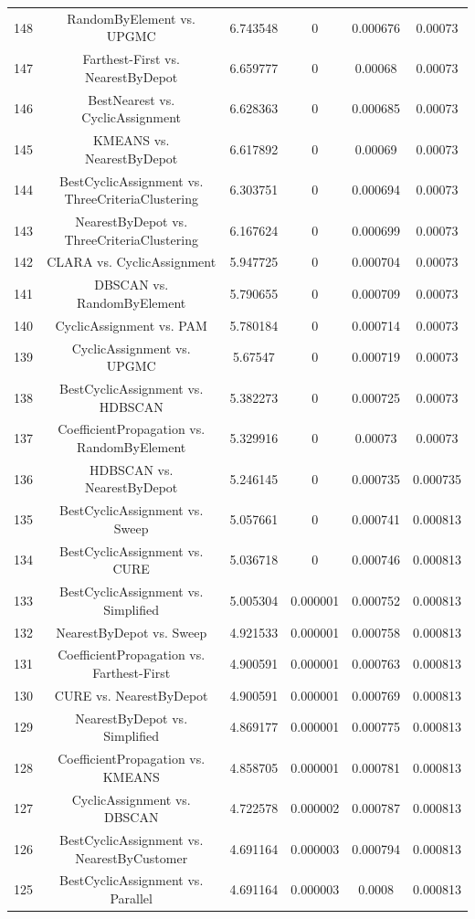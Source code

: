 \documentclass[a4paper,10pt]{article}
\begin{document}
\begin{landscape}
\begin{table}[!htp]
\begin{tabular}{cccccc}
148&RandomByElement vs. UPGMC&6.743548&0&0.000676&0.00073\\
147&Farthest-First vs. NearestByDepot&6.659777&0&0.00068&0.00073\\
146&BestNearest vs. CyclicAssignment&6.628363&0&0.000685&0.00073\\
145&KMEANS vs. NearestByDepot&6.617892&0&0.00069&0.00073\\
144&BestCyclicAssignment vs. ThreeCriteriaClustering&6.303751&0&0.000694&0.00073\\
143&NearestByDepot vs. ThreeCriteriaClustering&6.167624&0&0.000699&0.00073\\
142&CLARA vs. CyclicAssignment&5.947725&0&0.000704&0.00073\\
141&DBSCAN vs. RandomByElement&5.790655&0&0.000709&0.00073\\
140&CyclicAssignment vs. PAM&5.780184&0&0.000714&0.00073\\
139&CyclicAssignment vs. UPGMC&5.67547&0&0.000719&0.00073\\
138&BestCyclicAssignment vs. HDBSCAN&5.382273&0&0.000725&0.00073\\
137&CoefficientPropagation vs. RandomByElement&5.329916&0&0.00073&0.00073\\
136&HDBSCAN vs. NearestByDepot&5.246145&0&0.000735&0.000735\\
135&BestCyclicAssignment vs. Sweep&5.057661&0&0.000741&0.000813\\
134&BestCyclicAssignment vs. CURE&5.036718&0&0.000746&0.000813\\
133&BestCyclicAssignment vs. Simplified&5.005304&0.000001&0.000752&0.000813\\
132&NearestByDepot vs. Sweep&4.921533&0.000001&0.000758&0.000813\\
131&CoefficientPropagation vs. Farthest-First&4.900591&0.000001&0.000763&0.000813\\
130&CURE vs. NearestByDepot&4.900591&0.000001&0.000769&0.000813\\
129&NearestByDepot vs. Simplified&4.869177&0.000001&0.000775&0.000813\\
128&CoefficientPropagation vs. KMEANS&4.858705&0.000001&0.000781&0.000813\\
127&CyclicAssignment vs. DBSCAN&4.722578&0.000002&0.000787&0.000813\\
126&BestCyclicAssignment vs. NearestByCustomer&4.691164&0.000003&0.000794&0.000813\\
125&BestCyclicAssignment vs. Parallel&4.691164&0.000003&0.0008&0.000813\\

\end{tabular}
\end{table}
\end{landscape}
\end{document}
